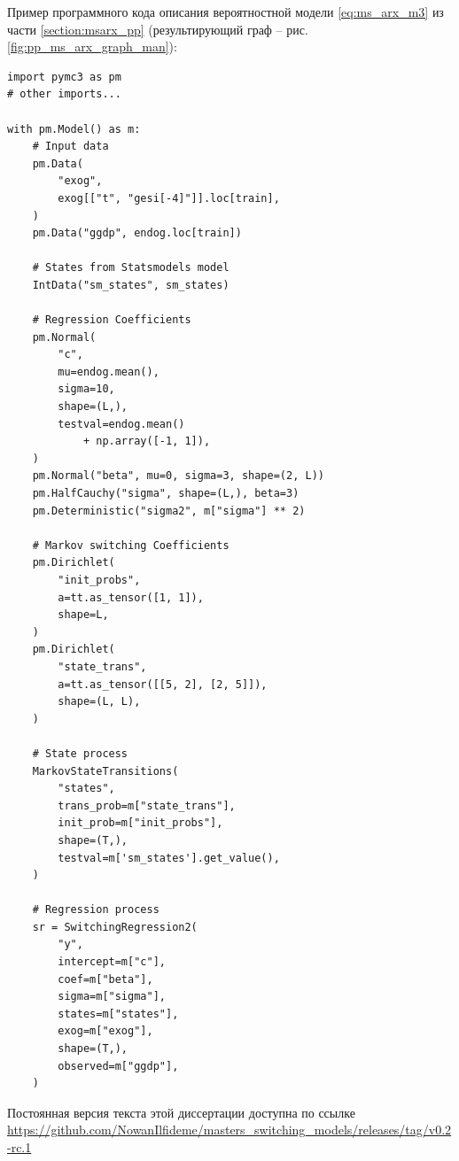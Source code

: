 \documentclass[a4paper,14pt]{extreport}
\newcommand{\coderepo}{https://github.com/NowanIlfideme/masters_switching_models}
\newcommand{\codelatesttag}{v0.2-rc.1}
\newcommand{\genurl}[1]{\url{\coderepo/#1}}
\begin{document}
Пример программного кода описания вероятностной модели \eqref{eq:ms_arx_m3} из части \ref{section:msarx_pp} (результирующий граф -- рис. \ref{fig:pp_ms_arx_graph_man}):

\lstset{language=Python}
\begin{lstlisting}
import pymc3 as pm
# other imports...

with pm.Model() as m:
	# Input data
	pm.Data(
		"exog", 
		exog[["t", "gesi[-4]"]].loc[train],
	)
	pm.Data("ggdp", endog.loc[train])

	# States from Statsmodels model
	IntData("sm_states", sm_states)

	# Regression Coefficients
	pm.Normal(
		"c", 
		mu=endog.mean(), 
		sigma=10, 
		shape=(L,),
		testval=endog.mean() 
			+ np.array([-1, 1]),
	)
	pm.Normal("beta", mu=0, sigma=3, shape=(2, L))
	pm.HalfCauchy("sigma", shape=(L,), beta=3)
	pm.Deterministic("sigma2", m["sigma"] ** 2)

	# Markov switching Coefficients
	pm.Dirichlet(
		"init_probs", 
		a=tt.as_tensor([1, 1]), 
		shape=L,
	)
	pm.Dirichlet(
		"state_trans", 
		a=tt.as_tensor([[5, 2], [2, 5]]), 
		shape=(L, L),
	)

	# State process
	MarkovStateTransitions(
		"states",
		trans_prob=m["state_trans"],
		init_prob=m["init_probs"],
		shape=(T,),
		testval=m['sm_states'].get_value(),
	)

	# Regression process
	sr = SwitchingRegression2(
		"y",
		intercept=m["c"],
		coef=m["beta"],
		sigma=m["sigma"],
		states=m["states"],
		exog=m["exog"],
		shape=(T,),
		observed=m["ggdp"],
	)
\end{lstlisting}

Постоянная версия текста этой диссертации доступна по ссылке \genurl{releases/tag/\codelatesttag}
\end{document}
